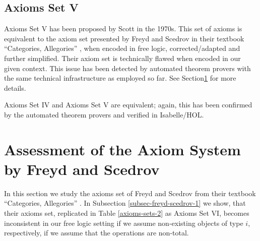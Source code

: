 \subsection{Axioms Set V}
Axioms Set V has been proposed by Scott \cite{Scott79} in the 1970s. 
This set of axioms is equivalent to the axiom set presented by Freyd
and Scedrov in their textbook ``Categories, Allegories''
\cite{FreydScedrov90}, when encoded in free logic, corrected/adapted
and further simplified.  Their axiom set is technically flawed when
encoded in our given context. This issue has been detected by
automated theorem provers with the same technical infrastructure as
employed so far. See Section\ref{sec-freyd-scedrov} for more
details. 

 Axioms Set IV and Axioms Set V are equivalent; again, this has been
 confirmed by the automated theorem provers and verified in
 Isabelle/HOL.

 \section{Assessment of the Axiom System by Freyd and
   Scedrov} \label{sec-freyd-scedrov} In this section we study the
 axioms set of Freyd and Scedrov from their textbook ``Categories,
 Allegories'' \cite{FreydScedrov90}.  In Subsection
 \ref{subsec-freyd-scedrov-1} we show, that their axioms set,
 replicated in Table \ref{axioms-sets-2} as Axioms Set VI, becomes
 inconsistent in our free logic setting if we assume non-existing
 objects of type $i$, respectively, if we assume that the operations
 are non-total.


